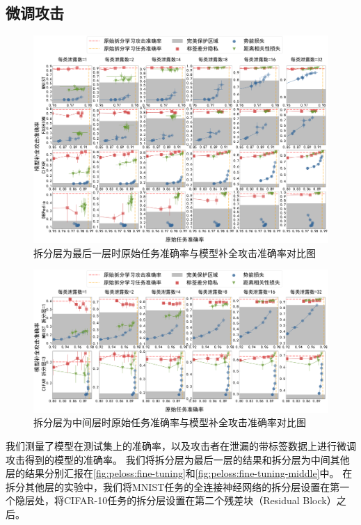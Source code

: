 \subsection{微调攻击}
\begin{figure}[h!]
    \centering
    \includegraphics[width=1\linewidth]{Z_Resources/peloss_fine-tuning}
    \caption{拆分层为最后一层时原始任务准确率与模型补全攻击准确率对比图}
    \label{fig:peloss:fine-tuning}
\end{figure}


\begin{figure}[h!]
    \centering
    \includegraphics[width=1\linewidth]{Z_Resources/peloss_fine-tuning-middle}
    \caption{拆分层为中间层时原始任务准确率与模型补全攻击准确率对比图}
    \label{fig:peloss:fine-tuning-middle}
\end{figure}
我们测量了模型在测试集上的准确率，以及攻击者在泄漏的带标签数据上进行微调攻击得到的模型的准确率。
我们将拆分层为最后一层的结果和拆分层为中间其他层的结果分别汇报在\autoref{fig:peloss:fine-tuning}和\autoref{fig:peloss:fine-tuning-middle}中。
%
在拆分其他层的实验中，我们将MNIST任务的全连接神经网络的拆分层设置在第一个隐层处，将CIFAR-10任务的拆分层设置在第二个残差块（Residual Block）之后。

